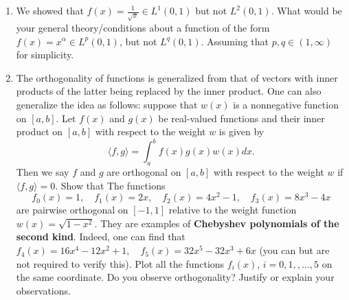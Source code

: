 \documentclass[6pt]{article}
\numberwithin{equation}{section}
\begin{document}
\begin{enumerate}
\item We showed that $f(x)=\frac{1}{\sqrt x}\in L^1(0,1)$ but not $L^2(0,1)$.  What would be your general theory/conditions about a function of the form $f(x)=x^\alpha\in L^p(0,1)$, but not $L^q(0,1)$.  Assuming that $p,q\in(1,\infty)$ for simplicity.

\item The orthogonality of functions is generalized from that of vectors with inner products of the latter being replaced by the inner product.  One can also generalize the idea as follows: suppose that $w(x)$ is a nonnegative function on $[a, b]$.  Let $f(x)$ and $g(x)$ be real-valued functions and their inner product on $[a, b]$ with respect to the weight $w$ is given by
\[\langle f, g\rangle=\int_a^b f(x) g(x) w(x) d x.\]
Then we say $f$ and $g$ are orthogonal on $[a, b]$ with respect to the weight $w$ if $\langle f, g\rangle=0$.  Show that 
The functions
\[f_0(x)=1, \quad f_1(x)=2 x, \quad f_2(x)=4 x^2-1, \quad f_3(x)=8 x^3-4 x\] 
are pairwise orthogonal on $[-1,1]$ relative to the weight function $w(x)=\sqrt{1-x^2}$.  They are examples of \textbf{Chebyshev polynomials of the second kind}.  Indeed, one can find that $f_4(x)=16 x^4-12 x^2+1, \quad f_5(x)=32 x^5-32 x^3+6 x$ (you can but are not required to verify this).  Plot all the functions $f_i(x)$, $i=0,1,,\ldots,5$ on the same coordinate.  Do you observe orthogonality?  Justify or explain your observations.  
 


\end{enumerate}
\end{document}
